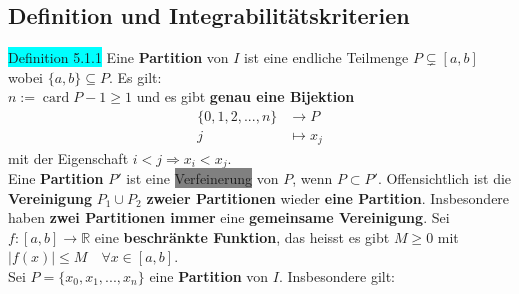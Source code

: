 \documentclass[landscape, 10pt]{article}
\newcommand{\R}{\mathbb{R}}
\begin{document}
\begin{multicols}{3}
       \subsection{Definition und Integrabilitätskriterien}
              \colorbox{cyan}{Definition 5.1.1} 
                     Eine \textbf{Partition} von 
                     \textcolor{NavyBlue}{$I$} 
                     ist eine endliche Teilmenge 
                     \textcolor{NavyBlue}{$P\subsetneq[a,b]$} 
                     wobei \textcolor{NavyBlue}{
                     $\{a,b\}\subseteq P$}. 
                     Es gilt: \\
                     \textcolor{NavyBlue}{
                     $n:=\operatorname{card} P-1\geqslant1$} 
                     und es gibt \textbf{genau eine Bijektion}
                     \begin{align*}
                            \{0,1,2,...,n\}&\longrightarrow P\\
                            j&\mapsto x_j
                     \end{align*}
                     mit der Eigenschaft 
                     \textcolor{NavyBlue}{
                     $i<j\Longrightarrow x_i<x_j$}.\\
              Eine \textbf{Partition} 
                     \textcolor{NavyBlue}{$P'$ }ist eine 
                     \colorbox{gray}{Verfeinerung} von 
                     \textcolor{NavyBlue}{$P$}, 
                     wenn \textcolor{NavyBlue}{$P\subset P'$}. 
                     Offensichtlich ist die \textbf{Vereinigung} 
                     \textcolor{NavyBlue}{$P_1\cup P_2$} 
                     \textbf{zweier Partitionen} 
                     wieder \textbf{eine Partition}. Insbesondere 
                     haben \textbf{zwei Partitionen immer} 
                     eine \textbf{gemeinsame Vereinigung}.
              Sei \textcolor{NavyBlue}{
                     $f:[a,b]\longrightarrow\R$} eine 
                     \textbf{beschränkte Funktion}, 
                     das heisst es gibt 
                     \textcolor{NavyBlue}{$M\geqslant0$} mit \\
                     \textcolor{NavyBlue}{
                     $|f(x)|\leqslant M\quad
                     \forall x\in[a,b]$}.\\
              Sei \textcolor{NavyBlue}{
                     $P=\{x_0,x_1,...,x_n\}$} eine 
                     \textbf{Partition} von 
                     \textcolor{NavyBlue}{$I$}. 
                     Insbesondere gilt: 

\end{multicols}
\end{document}
